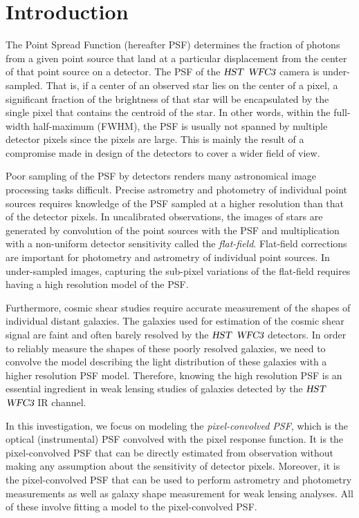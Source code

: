 \documentclass[onecolumn]{aastex61}
\newcommand{\project}[1]{{\textsl{#1}}}
\newcommand{\hst}{\project{HST}}
\newcommand{\wfc}{\project{WFC3}}
\begin{document}

\section{Introduction}

The Point Spread Function (hereafter PSF) determines the fraction of photons from a given point source that land at a particular displacement 
from the center of that point source on a detector. The PSF of the $\hst$ $\wfc$ camera is under-sampled. That is, if a center of an observed star lies 
on the center of a pixel, a significant fraction of the brightness of that star will be 
encapsulated by the single pixel that contains the centroid of the star.
In other words, within the full-width half-maximum (FWHM), the PSF is usually not spanned by multiple detector pixels since the pixels are large. 
This is mainly the result of a compromise made in design of the detectors to cover a wider field of view.

Poor sampling of the PSF by detectors renders many astronomical image processing tasks difficult. Precise astrometry and photometry 
of individual point sources requires knowledge of the PSF sampled at a higher resolution than that of the detector pixels. 
In uncalibrated observations, the images of stars are generated by convolution of the point sources with the PSF and multiplication 
with a non-uniform detector sensitivity called the \emph{flat-field}. Flat-field corrections are important for photometry and astrometry of 
individual point sources. In under-sampled images, capturing the sub-pixel variations of the flat-field requires having a high resolution 
model of the PSF. 

Furthermore, cosmic shear studies require accurate measurement of the shapes of individual distant galaxies. The galaxies used for estimation 
of the cosmic shear signal are faint and often barely resolved by the $\hst$ $\wfc$ detectors. In order to reliably measure the shapes of these poorly 
resolved galaxies, we need to convolve the model describing the light distribution of these galaxies with a higher resolution PSF model. 
Therefore, knowing the high resolution PSF is an essential ingredient in weak lensing studies of galaxies detected by the $\hst$ $\wfc$ IR 
channel.   

In this investigation, we focus on modeling the \emph{pixel-convolved PSF}, which is the optical (instrumental) PSF convolved with the 
pixel response function. It is the pixel-convolved PSF that can be directly estimated from observation without making any assumption 
about the sensitivity of detector pixels. Moreover, it is the pixel-convolved PSF that can be used to perform astrometry and photometry measurements as well as 
galaxy shape measurement for weak lensing analyses. All of these involve fitting a model to the pixel-convolved PSF. 
\end{document}
